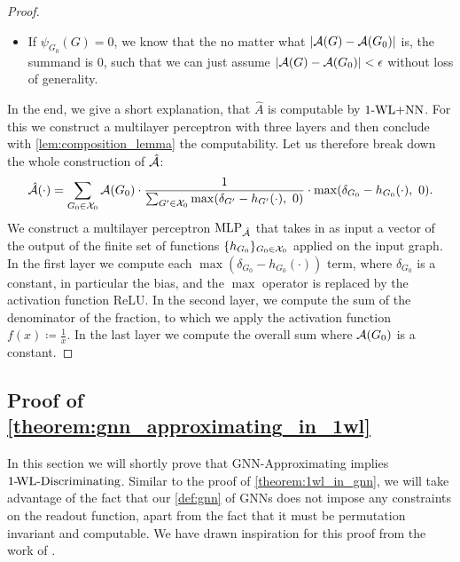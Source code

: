 \begin{proof}
\begin{itemize}
        \item If $\psi_{G_0}(G) = 0$, we know that the no matter what $|\mathcal{A}(G) - \mathcal{A}(G_0)|$ is, the summand is $0$, such that we can just assume $|\mathcal{A}(G) - \mathcal{A}(G_0)| < \epsilon$ without loss of generality.
    \end{itemize}
    In the end, we give a short explanation, that $\hat{A}$ is computable by $\text{1-WL+NN}$. For this we construct a multilayer perceptron with three layers and then conclude with \autoref{lem:composition_lemma} the computability. Let us therefore break down the whole construction of $\hat{\mathcal{A}}$:
    \begin{eqnarray*}
        \hat{\mathcal{A}}(\cdot) = \sum_{G_0 \in \mathcal{X}_0} \mathcal{A}(G_0) \cdot \frac{1}{\sum_{G' \in \mathcal{X}_0} \max(\delta_{G'} -  h_{G'}(\cdot), \ 0)} \cdot \max(\delta_{G_0} -  h_{G_0}(\cdot), \ 0).
    \end{eqnarray*}
    We construct a multilayer perceptron $\text{MLP}_{\hat{\mathcal{A}}}$ that takes in as input a vector of the output of the finite set of functions $\{ h_{G_0} \}_{G_0 \in \mathcal{X}_0}$ applied on the input graph. In the first layer we compute each $\max(\delta_{G_0} -  h_{G_0}(\cdot))$ term, where $\delta_{G_0}$ is a constant, in particular the bias, and the $\max$ operator is replaced by the activation function ReLU. In the second layer, we compute the sum of the denominator of the fraction, to which we apply the activation function $f(x) \coloneqq \frac{1}{x}$. In the last layer we compute the overall sum where $\mathcal{A}(G_0)$ is a constant.
\end{proof}

\subsection{Proof of \autoref{theorem:gnn_approximating_in_1wl}}
In this section we will shortly prove that GNN-Approximating implies $\text{1-\!WL-Discriminating}$. Similar to the proof of \autoref{theorem:1wl_in_gnn}, we will take advantage of the fact that our \autoref{def:gnn} of GNNs does not impose any constraints on the readout function, apart from the fact that it must be permutation invariant and computable. We have drawn inspiration for this proof from the work of \cite{Chen2019}.

